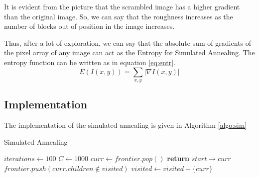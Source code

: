 \documentclass[journal, compsoc]{IEEEtran}
\begin{document}
It is evident from the picture that the scrambled image has a higher gradient than the original image.
So, we can say that the roughness increases as the number of blocks out of position in the image increases.

Thus, after a lot of exploration, we can say that the absolute sum of gradients of the pixel array of any image can act
as the Entropy for Simulated Annealing. The entropy function can be written as in equation \ref{eq:entr}.
\begin{equation}
E(I(x,y)) = \sum_{x,y} |\nabla I(x,y)|
\label{eq:entr}
\end{equation}

\subsection{Implementation}

The implementation of the simulated annealing is given in Algorithm \ref{algo:sim}

\begin{algorithm}
\caption{Simulated Annealing}\label{algo:sim}
\begin{algorithmic}[1]
\State $iterations \gets 100$
\State $C \gets 1000$
\State $curr \gets frontier.pop()$
\State \textbf{return} $start \rightarrow curr$
\EndIf
\State $frontier.push(curr.children \notin visited)$
\State $visited \gets visited + \{curr\}$
\EndWhile\label{bfsendwhile}
\EndProcedure
\end{algorithmic}
\end{algorithm}
\end{document}
